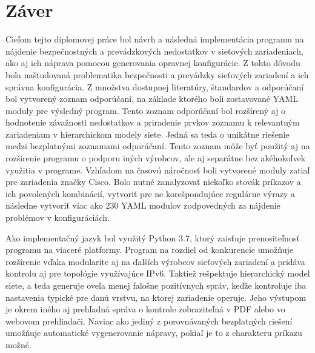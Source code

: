 \chapter*{Záver}
{}








Cieľom tejto diplomovej práce bol návrh a následná implementácia programu na nájdenie bezpečnostných a prevádzkových nedostatkov v sieťových zariadeniach, ako aj ich náprava pomocou generovania opravnej konfigurácie. Z tohto dôvodu bola naštudovaná problematika bezpečnosti a prevádzky sieťových zariadení a ich správna konfigurácia. Z množstva dostupnej literatúry, štandardov a odporúčaní bol vytvorený zoznam odporúčaní, na základe ktorého boli zostavované YAML moduly pre výsledný program. Tento zoznam odporúčaní bol rozšírený aj o hodnotenie závažnosti nedostatkov a priradenie prvkov zoznamu k relevantným zariadeniam v hierarchickom modely siete. Jedná sa teda o unikátne riešenie medzi bezplatnými zoznamami odporúčaní. Tento zoznam môže byť použitý aj na rozšírenie programu o podporu iných výrobcov, ale aj separátne bez akéhokoľvek využitia v programe. Vzhľadom na časovú náročnosť boli vytvorené moduly zatiaľ pre zariadenia značky Cisco. Bolo nutné zanalyzovať niekoľko stovák príkazov a ich povolených kombinácií, vytvoriť pre ne korešpondujúce regulárne výrazy a následne vytvoriť viac ako 230 YAML modulov zodpovedných za nájdenie problémov v konfiguráciách. 

Ako implementačný jazyk bol využitý Python 3.7, ktorý zaisťuje prenositeľnosť programu na viaceré platformy. Program na rozdiel od konkurencie umožňuje rozšírenie vďaka modularite aj na ďalších výrobcov sieťových zariadení a pridáva kontrolu aj pre topológie využívajúce IPv6. Taktiež rešpektuje hierarchický model siete, a teda generuje oveľa menej falošne pozitívnych správ, keďže kontroluje iba nastavenia typické pre danú vrstvu, na ktorej zariadenie operuje. Jeho výstupom je okrem iného aj prehľadná správa o kontrole zobraziteľná v PDF alebo vo webovom prehliadači. Naviac ako jediný z porovnávaných bezplatných riešení umožňuje automatické vygenerovanie nápravy, pokiaľ je to z charakteru príkazu možné. 


